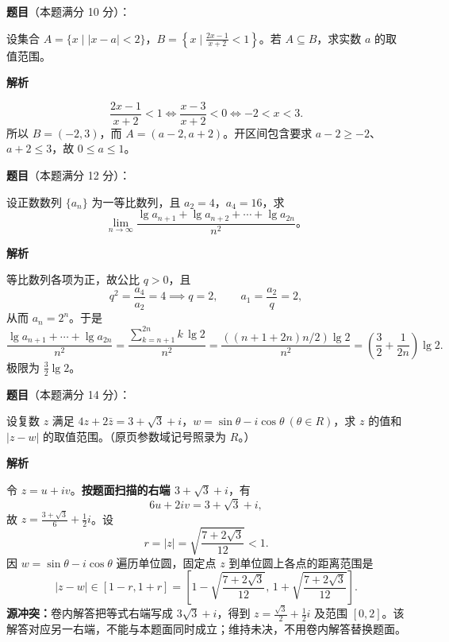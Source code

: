 \begin{answer}

\textbf{题目}（本题满分 10 分）：

设集合 $A=\{x\mid |x-a|<2\}$，$B=\left\{x\mid\frac{2x-1}{x+2}<1\right\}$。若 $A\subseteq B$，求实数 $a$ 的取值范围。

\textbf{解析}

\nopagebreak[4]
\[
\frac{2x-1}{x+2}<1\iff\frac{x-3}{x+2}<0\iff -2<x<3.
\]
所以 $B=(-2,3)$，而 $A=(a-2,a+2)$。开区间包含要求 $a-2\ge-2$、$a+2\le3$，故 $0\le a\le1$。


\end{answer}
\begin{answer}

\textbf{题目}（本题满分 12 分）：

设正数数列 $\{a_n\}$ 为一等比数列，且 $a_2=4$，$a_4=16$，求
\nopagebreak[4]
\[
\lim_{n\to\infty}\frac{\lg a_{n+1}+\lg a_{n+2}+\cdots+\lg a_{2n}}{n^2}\mbox{。}
\]

\textbf{解析}

等比数列各项为正，故公比 $q>0$，且
\nopagebreak[4]
\[
q^2=\frac{a_4}{a_2}=4\implies q=2,\qquad a_1=\frac{a_2}{q}=2,
\]
从而 $a_n=2^n$。于是
\nopagebreak[4]
\[
\frac{\lg a_{n+1}+\cdots+\lg a_{2n}}{n^2}
=\frac{\sum_{k=n+1}^{2n}k\,\lg2}{n^2}
=\frac{((n+1+2n)n/2)\lg2}{n^2}
=\left(\frac32+\frac1{2n}\right)\lg2.
\]
极限为 $\frac32\lg2$。


\end{answer}
\begin{answer}

\textbf{题目}（本题满分 14 分）：

设复数 $z$ 满足 $4z+2\bar z=3+\sqrt3+i$，$w=\sin\theta-i\cos\theta\ (\theta\in R)$，求 $z$ 的值和 $|z-w|$ 的取值范围。（原页参数域记号照录为 $R$。）

\textbf{解析}

令 $z=u+iv$。\textbf{按题面扫描的右端 $3+\sqrt3+i$}，有
\nopagebreak[4]
\[
6u+2iv=3+\sqrt3+i,
\]
故 $z=\frac{3+\sqrt3}{6}+\frac12i$。设
\nopagebreak[4]
\[
r=|z|=\sqrt{\frac{7+2\sqrt3}{12}}<1.
\]
因 $w=\sin\theta-i\cos\theta$ 遍历单位圆，固定点 $z$ 到单位圆上各点的距离范围是
\nopagebreak[4]
\[
|z-w|\in[1-r,1+r]
=\left[1-\sqrt{\frac{7+2\sqrt3}{12}},\,1+\sqrt{\frac{7+2\sqrt3}{12}}\right].
\]
\textbf{源冲突：}卷内解答把等式右端写成 $3\sqrt3+i$，得到 $z=\frac{\sqrt3}{2}+\frac12i$ 及范围 $[0,2]$。该解答对应另一右端，不能与本题面同时成立；维持未决，不用卷内解答替换题面。


\end{answer}
